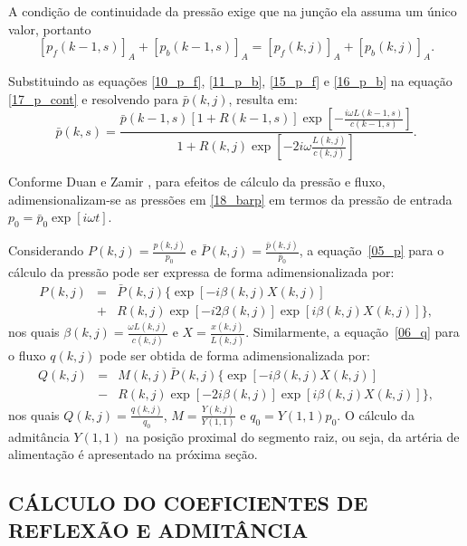 \documentclass[a4paper,12pt]{monografia}
\theoremstyle{plain}
\theoremstyle{definition}
\theoremstyle{remark}
\begin{document}
A condição de continuidade da pressão exige que na junção ela assuma um único valor, portanto
\begin{equation}
	\left[ p_f(k-1,s) \right]_A + \left[ p_b (k-1,s) \right]_A = \left[ p_f(k,j) \right]_A + \left[ p_b(k,j) \right]_A.
	\label{17_p_cont}
\end{equation}

Substituindo as equações \eqref{10_p_f}, \eqref{11_p_b}, \eqref{15_p_f} e \eqref{16_p_b} na equação \eqref{17_p_cont} e resolvendo para $\bar{p}(k,j)$, resulta em:
\begin{equation}
	\bar{p} (k,s) =  \frac{\bar{p}(k-1,s)\left[1 + R(k-1,s)\right] \exp\left[ -\frac{i \omega L(k-1,s)}{c(k-1,s)}\right]}{1 + R(k,j)\exp{\left[ -2i\omega \frac{L(k,j)}{c(k,j)}\right]}}.
	\label{18_barp}
\end{equation}

Conforme Duan e Zamir \cite{Duan}, para efeitos de cálculo da pressão e fluxo, adimensionalizam-se as pressões em \eqref{18_barp} em termos da pressão de entrada $p_0 = \bar{p}_0 \exp[i\omega t]$. 

Considerando $P(k,j) = \frac{p(k,j)}{p_0}$ e $\bar{P} (k,j) = \frac{\bar{p}(k,j)}{\bar{p}_0}$, a equação~\eqref{05_p} para o cálculo da pressão  pode ser expressa de forma adimensionalizada por:
\begin{eqnarray}
	P(k,j) &=& \bar{P}(k,j)\big\{\exp[ -i\beta(k,j) X(k,j)] \nonumber \\
	& +& R(k,j) \exp[-i2\beta(k,j)] \exp[i\beta(k,j) X(k,j)]\big\},
	\label{21_P}
\end{eqnarray}
nos quais $\beta(k,j) = \frac{\omega L(k,j)}{c(k,j)}$ e $X = \frac{x(k,j)}{L(k,j)}$. Similarmente, a equação~\eqref{06_q} para o fluxo $q(k,j)$ pode ser obtida de forma adimensionalizada por:
\begin{eqnarray}
	Q(k,j) &=& M(k,j)\bar{P}(k,j)\big\{ \exp\left[ -i\beta(k,j) X(k,j) \right] \nonumber \\ 
	&-& R(k,j) \exp[ -2i\beta(k,j)] \exp[i\beta(k,j) X(k,j)] \big\},
	\label{23_Q}
\end{eqnarray}
nos quais $Q(k,j) = \frac{q (k,j)}{q_0}$, $M = \frac{Y(k,j)}{Y(1,1)}$ e $q_0 = Y(1,1)p_0$. O cálculo da admitância $Y(1,1)$ na posição proximal do segmento raiz, ou seja, da artéria de alimentação é apresentado na próxima seção.

\subsection{CÁLCULO DO COEFICIENTES DE REFLEXÃO E ADMITÂNCIA}
\end{document}

